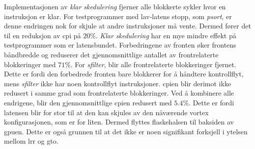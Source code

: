 Implementasjonen av \textit{klar skedulering} fjerner alle blokkerte sykler hvor en instruksjon er klar. For testprogrammer med lav-latens stopp, som \textit{psort}, er denne endringen nok for skjule at andre instruksjoner må vente. Dermed fører det til en reduksjon av \acrshort{cpi} på $20\%$. \textit{Klar skedulering} har en mye mindre effekt på testprogrammer som er latensbundet. Forbedringene av fronten øker frontens båndbredde og reduserer det gjennomsnittlige antallet av frontrelaterte blokkeringer med $71\%$. For \textit{sfilter}, blir alle frontrelaterte blokkeringer fjernet. Dette er fordi den forbedrede fronten bare blokkerer for å håndtere kontrollflyt, mens \textit{sfilter} ikke har noen kontrollflyt instruksjoner. \acrshort{cpi}en blir derimot ikke redusert i samme grad som frontrelaterte blokkeringer. Ved å kombinere alle endrigene, blir den gjennomsnittlige \acrshort{cpi}en redusert med $5.4\%$. Dette er fordi latensen blir for stor til at den kan skjules av den nåværende \Gls{vortex} konfigurasjonen, som er for liten. Dermed flyttes flaskehalsen til baksiden av \Gls{gpu}en. Dette er også grunnen til at det ikke er noen signifikant forksjell i ytelsen mellom \acrshort{lrr} og \acrshort{gto}.